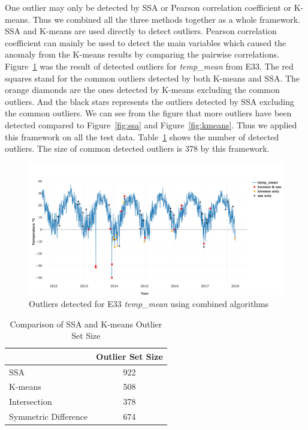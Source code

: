 \documentclass[letterpaper, 10 pt, conference]{ieeeconf}  %
\begin{document}
One outlier may only be detected by SSA or Pearson correlation coefficient or K-means. Thus we combined all the three methods together as a whole framework. SSA and K-means are used directly to detect outliers. Pearson correlation coefficient can mainly be used to detect the main variables which caused the anomaly from the K-means results by comparing the pairwise correlations. Figure~\ref{fig:combined} was the result of detected outliers for \textit{temp\_mean} from E33. The red squares stand for the common outliers detected by both K-means and SSA. The orange diamonds are the ones detected by K-means excluding the common outliers. And the black stars represents the outliers detected by SSA excluding the common outliers. We can see from the figure that more outliers have been detected compared to Figure~\ref{fig:ssa} and Figure~\ref{fig:kmeans}. Thus we applied this framework on all the test data. Table~\ref{tab:comp} shows the number of detected outliers. The size of common detected outliers is 378 by this framework.

\begin{figure}[ht]
    \centering
    \includegraphics[width=\textwidth]{combined.png}
    \caption{Outliers detected for E33 \textit{temp\_mean} using combined algorithms}
    \label{fig:combined}
\end{figure}

\begin{table}[ht]
\caption{Comparison of SSA and K-means Outlier Set Size}
\label{tab:comp}
\centering
\begin{tabular}{|l|c|}
\cline{2-2}
\multicolumn{1}{l|}{} & Outlier Set Size\\
\hline
SSA & 922\\
K-means & 508\\
Intersection & 378\\
Symmetric Difference & 674\\
\hline
\end{tabular}
\end{table}
\end{document}
